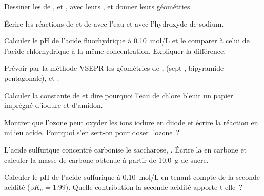 \begin{exercise}[$\star$]\label{exo:b1:p-block-16-18:3}
Dessiner les  de ,  et , avec
leurs , et donner leurs géométries.
\end{exercise}

\begin{exercise}[$\star$]\label{exo:b1:p-block-16-18:4}
Écrire les réactions de  et de  avec l'eau et avec
l'hydroxyde de sodium.
\end{exercise}

\begin{exercise}[$\star\star$]\label{exo:b1:p-block-16-18:5}
Calculer le pH de l'acide fluorhydrique à \qty{0.10}{mol/L} et le
comparer à celui de l'acide chlorhydrique à la même concentration.
Expliquer la différence.
\end{exercise}

\begin{exercise}[$\star\star$]\label{exo:b1:p-block-16-18:6}
Prévoir par la méthode VSEPR les géométries de , 
(sept , bipyramide pentagonale),  et .
\end{exercise}

\begin{exercise}[$\star\star$]\label{exo:b1:p-block-16-18:7}
Calculer la constante de  et dire pourquoi
l'eau de chlore bleuit un papier imprégné d'iodure et d'amidon.
\end{exercise}

\begin{exercise}[$\star\star$]\label{exo:b1:p-block-16-18:8}
Montrer que l'ozone peut oxyder les ions iodure en diiode et écrire la
réaction en milieu acide. Pourquoi s'en sert-on pour doser l'ozone~?
\end{exercise}

\begin{exercise}[$\star\star$]\label{exo:b1:p-block-16-18:9}
L'acide sulfurique concentré carbonise le saccharose, .
Écrire la  en carbone et calculer la masse de carbone
obtenue à partir de \qty{10.0}{g} de sucre.
\end{exercise}

\begin{exercise}[$\star\star\star$]\label{exo:b1:p-block-16-18:10}
Calculer le pH de l'acide sulfurique à \qty{0.10}{mol/L} en tenant compte
de la seconde acidité ($\mathrm{p}K_a = 1.99$). Quelle contribution la
seconde acidité apporte-t-elle~?
\end{exercise}

